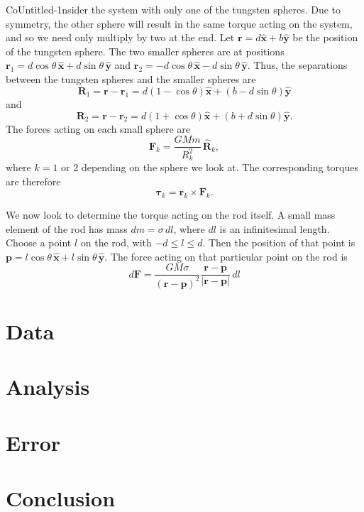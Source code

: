\documentclass[aps, reprint,amsmath,amssymb]{revtex4-1} %
\renewcommand{\vec}[1]{\boldsymbol{#1}}
\newcommand{\uv}[1]{\vec{\hat{#1}}}
\newcommand{\x}{\vec{\hat{x}}}
\newcommand{\y}{\vec{\hat{y}}}
\begin{document}
CoUntitled-1nsider the system with only one of the tungsten spheres. Due to symmetry,
the other sphere will result in the same torque acting on the system, and
so we need only multiply by two at the end. Let $\vec{r} = d\x + b\y$ be the
position of the tungsten sphere. The two smaller spheres are at positions
$\vec{r}_1 = d \cos\theta\,\x + d \sin \theta \, \y$ and $\vec{r}_2 = -d
\cos \theta\,\x - d \sin \theta \, \y$. Thus, the separations between the
tungsten spheres and the smaller spheres are
\[
    \vec{R}_1 = \vec{r} - \vec{r}_1 = d(1 - \cos\theta)\x + (b -
    d\sin\theta) \y
\]
and
\[
    \vec{R}_2 = \vec{r} - \vec{r}_2 = d(1 + \cos\theta)\x + (b + d \sin
    \theta) \y.
\]
The forces acting on each small sphere are
\begin{equation}
    \label{eq:forces}
    \vec{F}_k = \frac{G M m}{R_k^2}\,\uv{R}_k,
\end{equation}
where $k = 1$ or 2 depending on the sphere we look at. The corresponding
torques are therefore
\begin{equation}
    \label{eq:torques}
    \vec{\tau}_k = \vec{r}_k \times \vec{F}_k.
\end{equation}

We now look to determine the torque acting on the rod itself. A small mass
element of the rod has mass $dm = \sigma\,dl$, where $dl$ is an
infinitesimal length. Choose a point $l$ on the rod, with $-d\leq l \leq
d$. Then the position of that point is $\vec{p} = l\cos\theta\,\x +
l\sin\theta\,\y$. The force acting on that particular point on the rod is
\[
    d\vec{F} = \frac{G M \sigma}{(\vec{r} - \vec{p})^2} \frac{\vec{r} -
    \vec{p}}{|\vec{r} - \vec{p}|} \, dl
\]
    
\section{Data}

\section{Analysis}

\section{Error}

\section{Conclusion}
\end{document}
